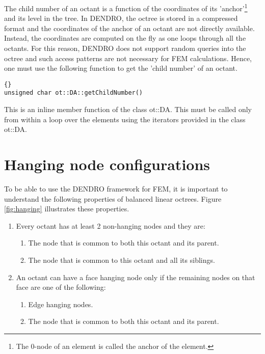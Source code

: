 \documentclass[10pt,reqno,a4paper]{report}
\numberwithin{equation}{section}
\begin{document}
The child number of an octant is a function of the coordinates of its 'anchor'\footnote{The 0-node of an element is called the anchor of the element.} and its level in the tree. In DENDRO, the octree is stored in a compressed format and the coordinates of the anchor of an octant are not directly available. Instead, the coordinates are computed on the fly as one loops through all the octants. For this reason, DENDRO does not support random queries into the octree and such access patterns are not necessary for FEM calculations. Hence, one must use the following function to get the 'child number' of an octant.

\begin{lstlisting}[frame=trbl, fontadjust]{}
unsigned char ot::DA::getChildNumber()
\end{lstlisting}

This is an inline member function of the class ot::DA. This must be called only from within a loop over the elements using the iterators 
 provided in the class ot::DA.
 
\section{Hanging node configurations}
\label{sec:hangingTypes}
To be able to use the DENDRO framework for FEM, it is important to understand the following properties of balanced linear octrees. Figure \ref{fig:hanging} illustrates these properties.
\begin{enumerate}
\item Every octant has at least 2 non-hanging nodes and they are:
\begin{enumerate}
\item The node that is common to both this octant and its parent.
\item The node that is common to this octant and all its siblings.
\end{enumerate}
\item An octant can have a face hanging node only if the remaining nodes on that face are one of the following:
\begin{enumerate}
\item Edge hanging nodes.
\item The node that is common to both this octant and its parent.
\end{enumerate}
\end{enumerate}
\end{document}
